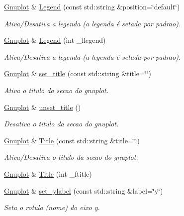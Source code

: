 \begin{DoxyCompactItemize}
\hyperlink{class_gnuplot}{Gnuplot} \& \hyperlink{class_gnuplot_aec3037a558d26535e3847c52d1b120aa}{Legend} (const std\+::string \&position=\char`\"{}default\char`\"{})
\begin{DoxyCompactList}\small\item\em Ativa/\+Desativa a legenda (a legenda é setada por padrao). \end{DoxyCompactList}\item 
\hyperlink{class_gnuplot}{Gnuplot} \& \hyperlink{class_gnuplot_a781ffec9b2ddd9706823b865acb95d0b}{Legend} (int \+\_\+flegend)
\begin{DoxyCompactList}\small\item\em Ativa/\+Desativa a legenda (a legenda é setada por padrao). \end{DoxyCompactList}\item 
\hyperlink{class_gnuplot}{Gnuplot} \& \hyperlink{class_gnuplot_aa693e806a115af1e2776a15078e75b46}{set\+\_\+title} (const std\+::string \&title=\char`\"{}\char`\"{})
\begin{DoxyCompactList}\small\item\em Ativa o titulo da secao do gnuplot. \end{DoxyCompactList}\item 
\hyperlink{class_gnuplot}{Gnuplot} \& \hyperlink{class_gnuplot_a0d205a55ae104403292622b49af14ae7}{unset\+\_\+title} ()
\begin{DoxyCompactList}\small\item\em Desativa o titulo da secao do gnuplot. \end{DoxyCompactList}\item 
\hyperlink{class_gnuplot}{Gnuplot} \& \hyperlink{class_gnuplot_a73bb8c97a946cafea0eca683450a6a62}{Title} (const std\+::string \&title=\char`\"{}\char`\"{})
\begin{DoxyCompactList}\small\item\em Ativa/\+Desativa o titulo da secao do gnuplot. \end{DoxyCompactList}\item 
\hyperlink{class_gnuplot}{Gnuplot} \& \hyperlink{class_gnuplot_afeab18e210616ae239adb7d816ecb2e9}{Title} (int \+\_\+ftitle)
\item 
\hyperlink{class_gnuplot}{Gnuplot} \& \hyperlink{class_gnuplot_a7654b86e3873aec4c5101abb466fe4ab}{set\+\_\+ylabel} (const std\+::string \&label=\char`\"{}y\char`\"{})
\begin{DoxyCompactList}\small\item\em Seta o rotulo (nome) do eixo y. \end{DoxyCompactList}\item 

\end{DoxyCompactItemize}
